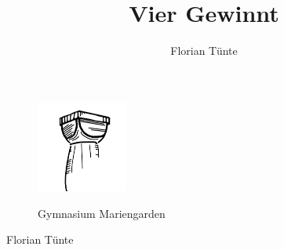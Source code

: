 \documentclass[12pt,a4paper]{article}
\title{Vier Gewinnt}
\author{Florian Tünte}
\begin{document}
	
	
	\begin{figure}[htbp]
		
		\begin{minipage}[t]{3cm}
			
			\vspace{0pt}
			
			\flushleft
			
			\includegraphics[width=3cm, height=3cm]{LogoGymnasiumMariengarden}
			
			\label{fig:LogoGymnasiumMariengarden}
			
		\end{minipage}
		
		\hfill
		
		\begin{minipage}[t]{6cm}
			
			\vspace{0pt}
			
			\flushleft
			
			{\Large Gymnasium Mariengarden}
			
		\end{minipage}
		
	\end{figure}
	
	\begin{flushright}
		
		\large{Florian Tünte}
		
	\end{flushright}
	
\end{document}
